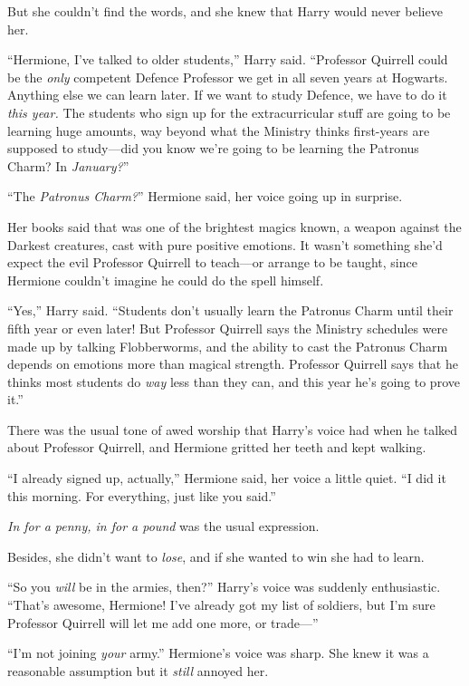 But she couldn’t find the words, and she knew that Harry would never believe her.

“Hermione, I’ve talked to older students,” Harry said. “Professor Quirrell could be the \emph{only} competent Defence Professor we get in all seven years at Hogwarts. Anything else we can learn later. If we want to study Defence, we have to do it \emph{this year.} The students who sign up for the extracurricular stuff are going to be learning huge amounts, way beyond what the Ministry thinks first-years are supposed to study—did you know we’re going to be learning the Patronus Charm? In \emph{January?}”

“The \emph{Patronus Charm?}” Hermione said, her voice going up in surprise.

Her books said that was one of the brightest magics known, a weapon against the Darkest creatures, cast with pure positive emotions. It wasn’t something she’d expect the evil Professor Quirrell to teach—or arrange to be taught, since Hermione couldn’t imagine he could do the spell himself.

“Yes,” Harry said. “Students don’t usually learn the Patronus Charm until their fifth year or even later! But Professor Quirrell says the Ministry schedules were made up by talking Flobberworms, and the ability to cast the Patronus Charm depends on emotions more than magical strength. Professor Quirrell says that he thinks most students do \emph{way} less than they can, and this year he’s going to prove it.”

There was the usual tone of awed worship that Harry’s voice had when he talked about Professor Quirrell, and Hermione gritted her teeth and kept walking.

“I already signed up, actually,” Hermione said, her voice a little quiet. “I did it this morning. For everything, just like you said.”

\emph{In for a penny, in for a pound} was the usual expression.

Besides, she didn’t want to \emph{lose}, and if she wanted to win she had to learn.

“So you \emph{will} be in the armies, then?” Harry’s voice was suddenly enthusiastic. “That’s awesome, Hermione! I’ve already got my list of soldiers, but I’m sure Professor Quirrell will let me add one more, or trade—”

“I’m not joining \emph{your} army.” Hermione’s voice was sharp. She knew it was a reasonable assumption but it \emph{still} annoyed her.

